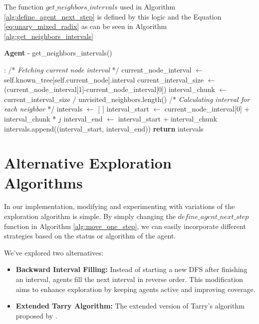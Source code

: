 The function $get\_neighbors\_intervals$ used in Algorithm \ref{alg:define_agent_next_step}
is defined by this logic and the Equation \ref{eq:unary_mixed_radix} as can be seen in Algorithm \ref{alg:get_neighbors_intervals}

\begin{algorithm}
\caption{\textbf{Agent} - get\_neighbors\_intervals()}
\label{alg:get_neighbors_intervals}
\begin{algorithmic}
    :
    \State /* \textit{Fetching current node interval } */
    \State current\_node\_interval $\gets$ self.known\_tree[self.current\_node].interval
    \State current\_interval\_size $\gets$ (current\_node\_interval[1]-current\_node\_interval[0])
    \State interval\_chunk $\gets$ current\_interval\_size / unvisited\_neighbors.length()
    \State
    \State /* \textit{Calculating interval for each neighbor} */
    \State intervals $\gets$ $[$ $ ]$
        \State interval\_start $\gets$ current\_node\_interval[0] + interval\_chunk * $j$
        \State interval\_end $\gets$ interval\_start + interval\_chunk
        \State intervals.append((interval\_start, interval\_end))
    \EndFor
    \State \textbf{return} intervals
    \EndProcedure
\end{algorithmic}
\end{algorithm}


\section{Alternative Exploration Algorithms}
\label{section_method_alt_exploration_alg}

In our implementation, modifying and experimenting with variations of the exploration algorithm is simple.
By simply changing the $define\_agent\_next\_step$ function in Algorithm \ref{alg:move_one_step}, we can easily incorporate different  strategies based on the status or algorithm of the agent.

We've explored two alternatives:

\begin{itemize}
\item \textbf{Backward Interval Filling:} Instead of starting a new DFS after finishing an interval, agents fill the next interval in reverse order. This modification aims to enhance exploration by keeping agents active and improving coverage.
\item \textbf{Extended Tarry Algorithm:} The extended version of Tarry's algorithm proposed by .
\end{itemize}
